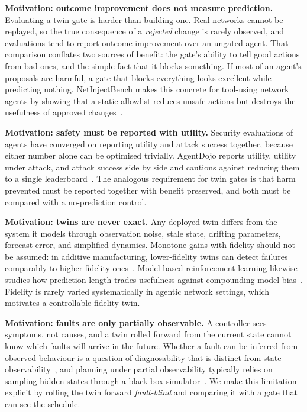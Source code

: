 \documentclass[conference]{IEEEtran}
\begin{document}
\textbf{Motivation: outcome improvement does not measure prediction.} Evaluating a twin gate is harder than building one. Real networks cannot be replayed, so the true consequence of a \emph{rejected} change is rarely observed, and evaluations tend to report outcome improvement over an ungated agent. That comparison conflates two sources of benefit: the gate's ability to tell good actions from bad ones, and the simple fact that it blocks something. If most of an agent's proposals are harmful, a gate that blocks everything looks excellent while predicting nothing. NetInjectBench makes this concrete for tool-using network agents by showing that a static allowlist reduces unsafe actions but destroys the usefulness of approved changes~\cite{netinjectbench}.

\textbf{Motivation: safety must be reported with utility.} Security evaluations of agents have converged on reporting utility and attack success together, because either number alone can be optimised trivially. AgentDojo reports utility, utility under attack, and attack success side by side and cautions against reducing them to a single leaderboard~\cite{agentdojo}. The analogous requirement for twin gates is that harm prevented must be reported together with benefit preserved, and both must be compared with a no-prediction control.

\textbf{Motivation: twins are never exact.} Any deployed twin differs from the system it models through observation noise, stale state, drifting parameters, forecast error, and simplified dynamics. Monotone gains with fidelity should not be assumed: in additive manufacturing, lower-fidelity twins can detect failures comparably to higher-fidelity ones~\cite{fidelityam}. Model-based reinforcement learning likewise studies how prediction length trades usefulness against compounding model bias~\cite{mbrlsurvey}. Fidelity is rarely varied systematically in agentic network settings, which motivates a controllable-fidelity twin.

\textbf{Motivation: faults are only partially observable.} A controller sees symptoms, not causes, and a twin rolled forward from the current state cannot know which faults will arrive in the future. Whether a fault can be inferred from observed behaviour is a question of diagnosability that is distinct from state observability~\cite{robustdiag}, and planning under partial observability typically relies on sampling hidden states through a black-box simulator~\cite{pomdpsurvey}. We make this limitation explicit by rolling the twin forward \emph{fault-blind} and comparing it with a gate that can see the schedule.
\end{document}
